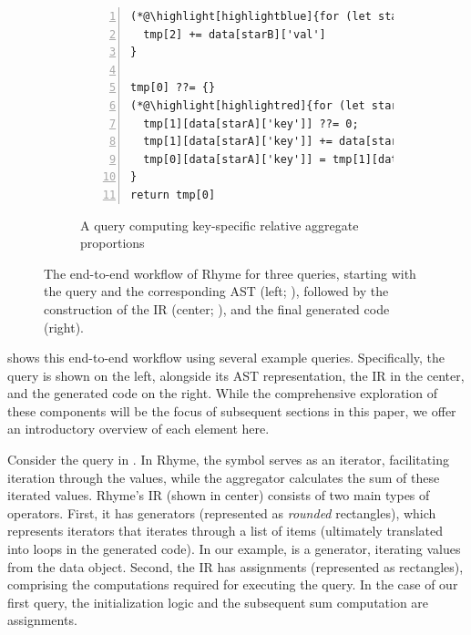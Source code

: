 \documentclass[runningheads]{llncs}
\newcommand{\lang}{Rhyme}
\begin{document}
\begin{figure}[t!]
\begin{subfigure}{\textwidth}
\begin{minipage}{0.38\textwidth}
\begin{lstlisting}[style=JavaScriptTiny, columns=flexible, numbers=left, xleftmargin=2pt]
(*@\highlight[highlightblue]{for (let starB in data)}@*) {  // loop hoisted!
  tmp[2] += data[starB]['val']
}

tmp[0] ??= {}
(*@\highlight[highlightred]{for (let starA in data)}@*) {
  tmp[1][data[starA]['key']] ??= 0;
  tmp[1][data[starA]['key']] += data[starA]['val']
  tmp[0][data[starA]['key']] = tmp[1][data[starA]['key']] / tmp[2] (*@\label{line:deps}@*)
}
return tmp[0]
\end{lstlisting}
\end{minipage}
\caption{A query computing key-specific 
relative aggregate proportions
}\label{fig:intro_q3}
\end{subfigure}
\caption{
The end-to-end workflow of \lang{} for three queries, starting with the query
and the corresponding AST (left; ),
followed by the construction of the IR (center; ), and the final generated code (right).
}\label{fig:intro}
\end{figure}

 shows this end-to-end workflow using several example queries.
Specifically, the query is shown on the left, alongside its AST representation,
the IR in the center, and the generated code on the right.
While the comprehensive exploration of these components will be the focus of
subsequent sections in this paper, we offer an introductory overview of each
element here.

Consider the query in .
In \lang{}, the \inline{*} symbol serves as an iterator, facilitating iteration through
the  values, while the aggregator  calculates the sum of
these iterated values.
\lang{}'s IR (shown in center) consists of two main types of operators.
First, it has generators (represented as \emph{rounded} rectangles), which represents iterators
that iterates through a list of items (ultimately translated into loops in
the generated code).
In our example,  is a generator, iterating values from the data object.
Second, the IR has assignments (represented as rectangles), comprising the
computations required for executing the query.
In the case of our first query, the initialization logic  and
the subsequent sum computation  are assignments.
\end{document}
